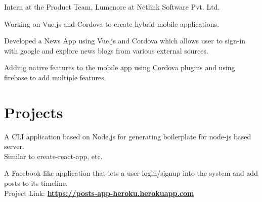 \documentclass[]{ayush-gupta-resume-openfont}
\begin{document}
\begin{minipage}[t]{0.62\textwidth}
\begin{tightemize}
\item Intern at the Product Team, Lumenore at Netlink Software Pvt. Ltd.
\item Working on Vue.js and Cordova to create hybrid mobile applications.
\item Developed a News App using Vue.js and Cordova which allows user to sign-in with google and explore news blogs from various external sources.
\item Adding native features to the mobile app using Cordova plugins and using firebase to add multiple features.
\end{tightemize}
\sectionsep


\section{Projects}
A CLI application based on Node.js for generating boilerplate for node-js based server. \\
Similar to create-react-app, etc.
\sectionsep

A Facebook-like application that lets a user login/signup into the system and add posts to its timeline. \\
Project Link: \textbf {\href{https://posts-app-heroku.herokuapp.com/}{https://posts-app-heroku.herokuapp.com}} 
\sectionsep


% 
% 

\end{minipage} 
\end{document}
